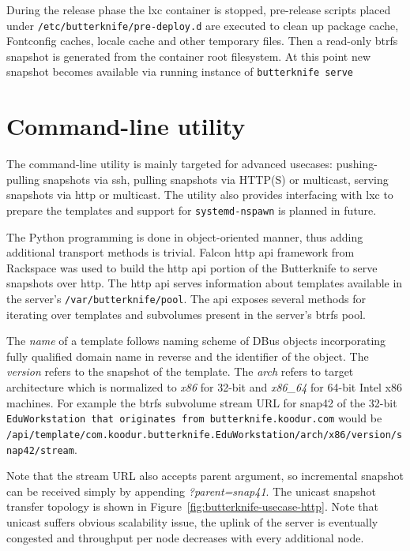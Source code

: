 \documentclass[a4paper,11pt]{kth-mag}
\begin{document}
During the release phase the \acrshort{lxc} container is stopped,
pre-release scripts placed under \lstinline!/etc/butterknife/pre-deploy.d!
are executed to clean up package cache,
Fontconfig caches, locale cache
and other temporary files.
Then a read-only \acrshort{btrfs} snapshot is generated from the container root filesystem.
At this point new snapshot becomes available via running instance of
\lstinline!butterknife serve!


\section{Command-line utility}

The command-line utility is mainly targeted for
advanced usecases:
pushing-pulling snapshots via \acrfull{ssh},
pulling snapshots via HTTP(S) or multicast,
serving snapshots via \acrshort{http} or multicast.
The utility also provides interfacing with
\acrshort{lxc} to prepare the templates and
support for \lstinline!systemd-nspawn!
is planned in future.


The Python programming is done in object-oriented manner,
thus adding additional transport methods is trivial.
Falcon \acrshort{http} \acrshort{api} framework
\cite{falcon}
from Rackspace was used to build the
\acrshort{http} \acrshort{api} portion of the Butterknife to serve
snapshots over \acrshort{http}.
The \acrshort{http} \acrshort{api} serves information about templates
available in the server's \lstinline!/var/butterknife/pool!.
The \acrshort{api} exposes several methods for iterating
over templates and subvolumes present in
the server's \acrshort{btrfs} pool.

The \emph{name} of a template follows naming scheme of DBus objects
incorporating fully qualified domain name in reverse and the identifier
of the object.
The \emph{version} refers to the snapshot of the template.
The \emph{arch} refers to target architecture which is normalized
to \emph{x86} for 32-bit and \emph{x86\_64} for 64-bit Intel x86 machines.
For example the \acrshort{btrfs} subvolume stream URL for
snap42 of the 32-bit
\lstinline!EduWorkstation that originates from butterknife.koodur.com! would be
\lstinline!/api/template/com.koodur.butterknife.EduWorkstation/arch/x86/version/snap42/stream!.

Note that the stream URL also accepts parent argument,
so incremental snapshot can be received simply by appending
\emph{?parent=snap41}.
The unicast snapshot transfer topology is
shown in Figure~\ref{fig:butterknife-usecase-http}.
Note that unicast suffers obvious scalability issue,
the uplink of the server is eventually congested and
throughput per node decreases with every additional node.
\end{document}
